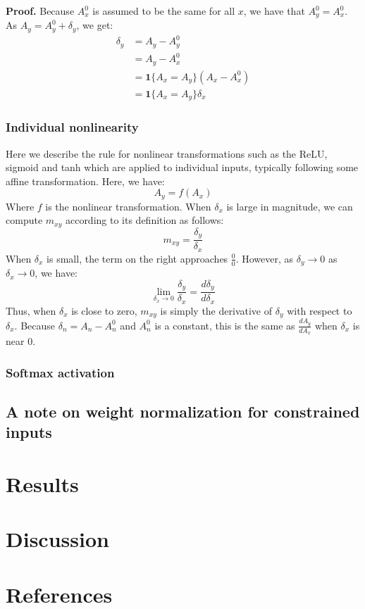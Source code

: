 \documentclass{article}
\begin{document}
{\bf Proof.} Because $A_x^0$ is assumed to be the same for all $x$, we have that $A_y^0 = A_x^0$. As $A_y = A_y^0 + \delta_y$, we get:
\begin{equation}
\begin{aligned}
\delta_y &= A_y - A_y^0\\
             &= A_y - A_x^0\\
             &= \bm{1}\{A_x = A_y\} (A_x - A_x^0)\\
             &= \bm{1}\{A_x = A_y\} \delta_x
\end{aligned}
\end{equation}

\subsubsection{Individual nonlinearity}

Here we describe the rule for nonlinear transformations such as the ReLU, sigmoid and tanh which are applied to individual inputs, typically following some affine transformation. Here, we have:
\begin{equation}
A_y = f(A_x)
\end{equation}
Where $f$ is the nonlinear transformation. When $\delta_x$ is large in magnitude, we can compute $m_{xy}$ according to its definition as follows:
\begin{equation}
m_{xy} = \frac{\delta_y}{\delta_x}
\end{equation}
When $\delta_x$ is small, the term on the right approaches $\frac{0}{0}$. However, as $\delta_y \rightarrow 0$ as $\delta_x \rightarrow 0$, we have:
\begin{equation}
\lim_{\delta_x \rightarrow 0} \frac{\delta_y}{\delta_x} = \frac{d \delta_y}{d \delta_x}
\end{equation}
Thus, when $\delta_x$ is close to zero, $m_{xy}$ is simply the derivative of $\delta_y$ with respect to $\delta_x$. Because $\delta_n = A_n - A_n^0$ and $A_n^0$ is a constant, this is the same as $\frac{dA_y}{dA_x}$ when $\delta_x$ is near $0$.

\subsubsection{Softmax activation}

\subsection{A note on weight normalization for constrained inputs}

\section{Results}

\section{Discussion}

\section{References}
\end{document}
